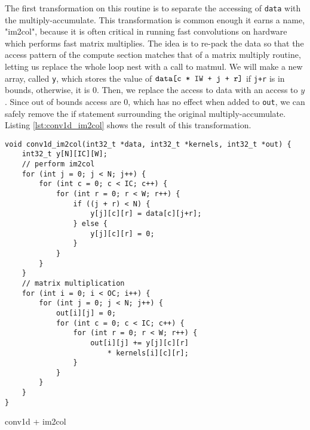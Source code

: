\documentclass[acmsmall, nonacm=true]{acmart}
\begin{document}
The first transformation on this routine is to separate the accessing of \verb|data| with the multiply-accumulate. This transformation is common enough it earns a name, "im2col", because it is often critical in running fast convolutions on hardware which performs fast matrix multiplies. The idea is to re-pack the data so that the access pattern of the compute section matches that of a matrix multiply routine, letting us replace the whole loop nest with a call to matmul. We will make a new array, called \verb|y|, which stores the value of $\verb|data[c * IW + j + r]|$ if \verb|j+r| is in bounds, otherwise, it is 0. Then, we replace the access to data with an access to $y$. Since out of bounds access are $0$, which has no effect when added to \verb|out|, we can safely remove the if statement surrounding the original multiply-accumulate. Listing \ref{lst:conv1d_im2col} shows the result of this transformation.

\begin{listing}
    \centering
    \begin{verbatim}
void conv1d_im2col(int32_t *data, int32_t *kernels, int32_t *out) {
    int32_t y[N][IC][W];
    // perform im2col
    for (int j = 0; j < N; j++) {
        for (int c = 0; c < IC; c++) {
            for (int r = 0; r < W; r++) {
                if ((j + r) < N) {
                    y[j][c][r] = data[c][j+r];
                } else {
                    y[j][c][r] = 0;
                }                    
            }
        }
    }
    // matrix multiplication
    for (int i = 0; i < OC; i++) {
        for (int j = 0; j < N; j++) {
            out[i][j] = 0;
            for (int c = 0; c < IC; c++) {
                for (int r = 0; r < W; r++) {
                    out[i][j] += y[j][c][r]
                        * kernels[i][c][r];
                }
            }
        }
    }
}
\end{verbatim}
    \caption{conv1d + im2col}
    \label{lst:conv1d_im2col}
\end{listing}
\end{document}

